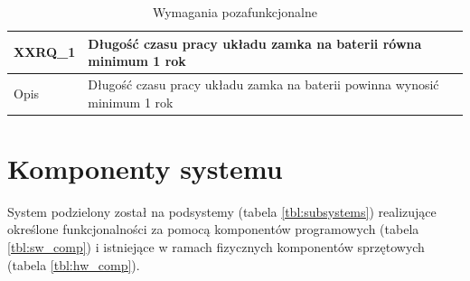         \begin{table}[h!]
            \caption{Wymagania pozafunkcjonalne}
            \centering
            \begin{subtable}[c]{\textwidth}
                \centering
                \begin{tabular}{|p{2cm}|p{12cm}|}
                    \hline XXRQ\_1      & \textbf{Długość czasu pracy układu zamka na baterii równa minimum 1 rok}  \\
                    \hline \cellcolor[gray]{0.8} Opis         & Długość czasu pracy układu zamka na baterii powinna wynosić minimum 1 rok \\
                    \hline
                \end{tabular}
                \label{tbl:xxrq1}    
            \end{subtable}
            \label{tbl:xxrq}
        \end{table}

        \section{Komponenty systemu}

            System podzielony został na podsystemy (tabela \ref{tbl:subsystems}) realizujące określone funkcjonalności za pomocą komponentów programowych (tabela \ref{tbl:sw_comp}) i istniejące w ramach fizycznych komponentów sprzętowych (tabela \ref{tbl:hw_comp}).

